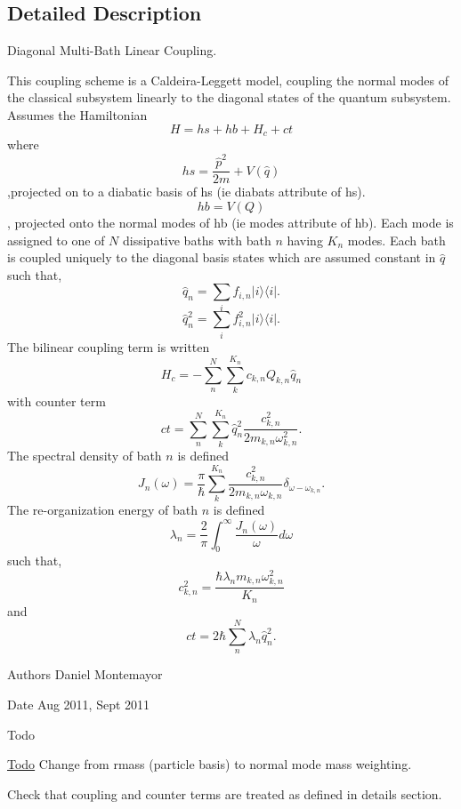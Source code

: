 \subsection{Detailed Description}
Diagonal Multi-\/\+Bath Linear Coupling. 

This coupling scheme is a Caldeira-\/\+Leggett model, coupling the normal modes of the classical subsystem linearly to the diagonal states of the quantum subsystem. Assumes the Hamiltonian \[ H=hs+hb+H_c+ct \] where \[ hs=\frac{\hat p^2}{2m}+V(\hat q) \] ,projected on to a diabatic basis of hs (ie diabats attribute of hs). \[ hb=V(Q) \] , projected onto the normal modes of hb (ie modes attribute of hb). Each mode is assigned to one of $ N $ dissipative baths with bath $ n $ having $ K_n $ modes. Each bath is coupled uniquely to the diagonal basis states which are assumed constant in $ \hat q $ such that, \[ \hat q_n=\sum_i f_{i,n} |i \rangle\langle i|. \] \[ \hat q_n^2=\sum_i f_{i,n}^2 |i \rangle\langle i|. \] The bilinear coupling term is written \[ H_c=-\sum_n^N \sum_k^{K_n} c_{k,n} Q_{k,n} \hat q_n \] with counter term \[ ct=\sum_n^N \sum_k^{K_n} \hat q_n^2 \frac{c_{k,n}^2}{2m_{k,n}\omega_{k,n}^2}. \] The spectral density of bath $ n $ is defined \[ J_n(\omega)=\frac{\pi}{\hbar}\sum_k^{K_n}\frac{c_{k,n}^2}{2m_{k,n}\omega_{k,n}}\delta_{\omega-\omega_{k,n}}.\] The re-\/organization energy of bath $ n $ is defined \[ \lambda_n=\frac{2}{\pi} \int_0^\infty \frac{J_n(\omega)}{\omega} d\omega \] such that, \[ c_{k,n}^2=\frac{\hbar \lambda_n m_{k,n} \omega_{k,n}^2}{K_n}\] and \[ ct=2 \hbar \sum_n^N \lambda_n \hat q_n^2 .\] \begin{DoxyAuthor}{Authors}
Daniel Montemayor
\end{DoxyAuthor}
\begin{DoxyDate}{Date}
Aug 2011, Sept 2011 
\end{DoxyDate}
\begin{DoxyRefDesc}{Todo}
\item[\hyperlink{todo__todo000002}{Todo}]Change from rmass (particle basis) to normal mode mass weighting. 

Check that coupling and counter terms are treated as defined in details section. \end{DoxyRefDesc}


